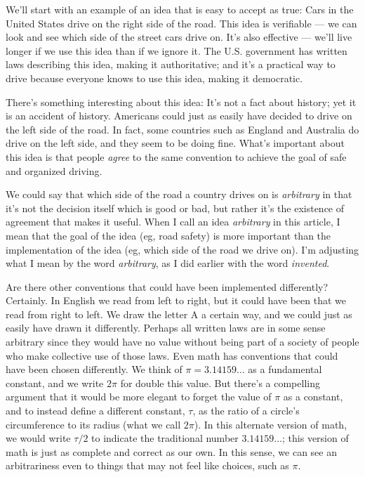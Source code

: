 \documentclass[11pt, oneside]{article}
\begin{document}

We'll start with an example of an
idea that is easy to accept as true:
Cars in the United States drive on the right side of the road.
This idea is verifiable --- we can look and see which side of the street cars
drive on.
It's also effective --- we'll live
longer if we use this idea than if we ignore it.
The U.S.
government has written laws describing this idea, making it authoritative;
and it's a practical
way to drive
because everyone knows to use this idea, making it democratic.

There's something interesting about this idea:
It's not a fact about history; yet it is an accident of history.
Americans could just as
easily have decided to drive on the left side of the road. In fact,
some countries such as England and Australia do drive on the left side, and they
seem to be doing fine. What's important about this idea is that people
{\em agree} to the same convention to achieve the goal of
safe and organized driving.

We could say that which side of the road a country drives on is {\em arbitrary}
in that it's not the decision itself which is good or bad, but rather it's the
existence of agreement that makes it useful.
When I call an idea {\em arbitrary}
in this article, I mean that the goal of the idea (eg, road safety) is more
important than the implementation of the idea (eg, which side of the road we
drive on).
I'm adjusting what I mean by the word {\em arbitrary}, as I did earlier with the
word {\em invented}.

Are there other conventions that could have been implemented differently?
Certainly. In English we read from left to right, but it could have been that we
read from right to left. We draw the letter A a certain way, and we could just
as easily have drawn it differently. Perhaps all written laws are in some sense
arbitrary since they would have no value without being part of a society of
people who make collective use of those laws.
Even math has conventions that could have been chosen differently.
We
think of $\pi=3.14159\ldots$ as a fundamental constant, and we write $2\pi$ for
double this value.
But there's a compelling argument that it would be more elegant to forget the
value of $\pi$ as a constant, and to instead define a different constant,
$\tau$, as the ratio of a circle's circumference to its radius (what we call
$2\pi$). In this alternate version of math, we would write $\tau/2$ to indicate
the traditional number $3.14159\ldots$; this version of math is just as
complete and correct as our own. In this sense, we can see an arbitrariness even
to things that may not feel like choices, such as $\pi$.
\end{document}

